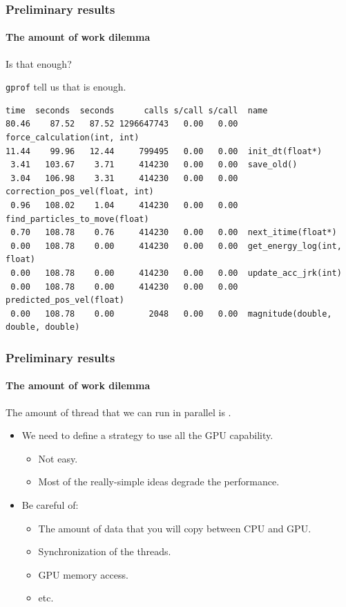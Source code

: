 \begin{frame}[fragile]
    \frametitle{Preliminary results}
    \framesubtitle{The amount of work dilemma}

    Is that enough?

    \texttt{gprof} tell us that is  enough.
    \tiny{
    \begin{lstlisting}
time  seconds  seconds      calls s/call s/call  name
80.46    87.52   87.52 1296647743   0.00   0.00  force_calculation(int, int)
11.44    99.96   12.44     799495   0.00   0.00  init_dt(float*)
 3.41   103.67    3.71     414230   0.00   0.00  save_old()
 3.04   106.98    3.31     414230   0.00   0.00  correction_pos_vel(float, int)
 0.96   108.02    1.04     414230   0.00   0.00  find_particles_to_move(float)
 0.70   108.78    0.76     414230   0.00   0.00  next_itime(float*)
 0.00   108.78    0.00     414230   0.00   0.00  get_energy_log(int, float)
 0.00   108.78    0.00     414230   0.00   0.00  update_acc_jrk(int)
 0.00   108.78    0.00     414230   0.00   0.00  predicted_pos_vel(float)
 0.00   108.78    0.00       2048   0.00   0.00  magnitude(double, double, double)
    \end{lstlisting}
    }

\end{frame}


\begin{frame}[fragile]
    \frametitle{Preliminary results}
    \framesubtitle{The amount of work dilemma}

    The amount of thread that we can run in parallel is .

    \begin{itemize}
        \item<2-> We need to define a strategy to use all the GPU capability.
        \begin{itemize}
            \item<3-> Not easy.
            \item<3-> Most of the really-simple ideas degrade the performance.
        \end{itemize}
        \item<4-> Be careful of:
        \begin{itemize}
            \item<5-> The amount of data that you will copy between CPU and GPU.
            \item<5-> Synchronization of the threads.
            \item<5-> GPU memory access.
            \item<5-> etc.
        \end{itemize}
    \end{itemize}
\end{frame}
